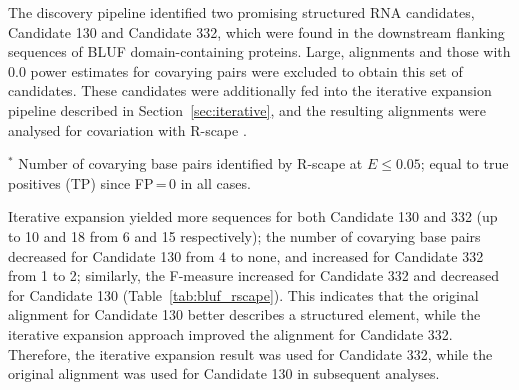 The discovery pipeline identified two promising structured RNA candidates, Candidate 130 and Candidate 332, which were found in the downstream flanking sequences of \ac{BLUF} domain-containing proteins.
Large, alignments and those with 0.0 power estimates for covarying pairs were excluded to obtain this set of candidates.
These candidates were additionally fed into the iterative expansion pipeline described in Section~\ref{sec:iterative}, and the resulting alignments were analysed for covariation with R-scape \citep{Rivas2017}.

\begin{table}[H]
\centering
\footnotesize
\caption[Covariation analysis for the two BLUF-associated candidates]{\textbf{Covariation analysis for the two BLUF-associated candidates, before and after iterative expansion of the covariance model.}
Candidates are identified through the discovery pipeline and then analysed with R-scape for covariation before iterative expansion of the covariance model, over the identified flanking intergenic sequences.}
\label{tab:bluf_rscape}
    

\par\smallskip
\begin{minipage}{\textwidth}
\raggedright
$^{*}$ Number of covarying base pairs identified by R-scape at $E \le 0.05$; equal to true positives (TP) since FP\,=\,0 in all cases.
\end{minipage}
\end{table}

Iterative expansion yielded more sequences for both Candidate 130 and 332 (up to 10 and 18 from 6 and 15 respectively); the number of covarying base pairs decreased for Candidate 130 from 4 to none, and increased for Candidate 332 from 1 to 2; similarly, the F-measure increased for Candidate 332 and decreased for Candidate 130 (Table~\ref{tab:bluf_rscape}).
This indicates that the original alignment for Candidate 130 better describes a structured element, while the iterative expansion approach improved the alignment for Candidate 332.
Therefore, the iterative expansion result was used for Candidate 332, while the original alignment was used for Candidate 130 in subsequent analyses.


